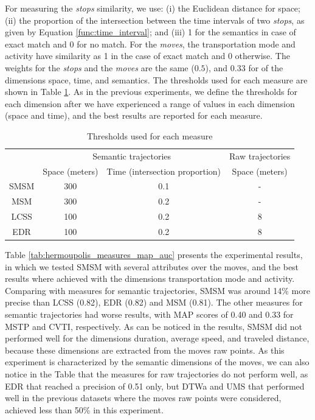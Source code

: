 \documentclass[12pt]{article}
\begin{document}
For measuring the \emph{stops} similarity, we use: (i) the Euclidean distance for space; (ii) the proportion of the intersection between the time intervals of two \emph{stops}, as given by Equation \ref{func:time_interval}; and (iii) 1 for the semantics in case of exact match and 0 for no match. For the \emph{moves}, the transportation mode and activity have  similarity as 1 in the case of exact match and 0 otherwise. The weights for the \emph{stops} and the \emph{moves} are the same ($0.5$), and $0.33$ for of the  dimensions space, time, and semantics. The thresholds used for each measure are shown in Table \ref{tab:hermoupolis_thresholds}.  As in the previous experiments, we define the thresholds for each dimension after we have experienced a range of values in each dimension (space and time), and the best results are reported for each measure.

\begin{table}[!h]
\scriptsize
  \centering
  \begin{tabular}{|c|c|c|c|}
  	\hline
  & \multicolumn{2}{c|}{Semantic trajectories} & \multicolumn{1}{c|}{Raw trajectories} \\
 	\cline{2-4}
  & Space (meters)& Time (intersection proportion) & Space (meters) \\
  	\hline
 SMSM & 300 & 0.1 & - \\
 MSM & 300 & 0.2 & - \\
 LCSS & 100 & 0.2 & 8 \\
 EDR & 100 & 0.2 & 8 \\
    \hline
  \end{tabular}
  \caption{Thresholds used for each measure}
  \label{tab:hermoupolis_thresholds}
\end{table}

Table \ref{tab:hermoupolis_measures_map_auc} presents the experimental results, in which we tested SMSM with several  attributes over the moves, and the best results where achieved with the dimensions transportation mode and activity. Comparing with measures for semantic trajectories, SMSM was around 14\% more precise than LCSS (0.82), EDR (0.82) and MSM (0.81). The other measures for semantic trajectories had worse results, with MAP scores of 0.40 and 0.33 for MSTP and CVTI, respectively. As can be noticed in the results,  SMSM did not performed well for the dimensions duration, average speed, and traveled distance, because these dimensions are extracted from the moves raw points. As this experiment is characterized by the semantic dimensions of the moves, we can also notice in the Table that the measures for raw trajectories do not perform well, as EDR that reached a precision of 0.51 only, but DTWa and UMS that performed well in the previous datasets where the moves raw points were considered, achieved less than 50\% in this experiment.
\end{document}
